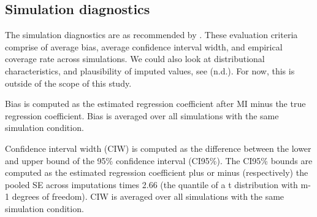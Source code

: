 \documentclass[article]{jss}
\begin{document}
\subsection{Simulation diagnostics}
The simulation diagnostics are as recommended by \cite[\S~2.5.2]{buur18}. These evaluation criteria comprise of average bias, average confidence interval width, and empirical coverage rate across simulations. %
We could also look at distributional characteristics, and plausibility of imputed values, see \cite{vinknd} (n.d.). For now, this is outside of the scope of this study. %



Bias is computed as the estimated regression coefficient after MI minus the true regression coefficient. Bias is averaged over all simulations with the same simulation condition.

Confidence interval width (CIW) is computed as the difference between the lower and upper bound of the 95\% confidence interval (CI95\%). The CI95\% bounds are computed as the estimated regression coefficient plus or minus (respectively) the pooled SE across imputations times 2.66 (the quantile of a t distribution with m-1 degrees of freedom). CIW is averaged over all simulations with the same simulation condition.
\end{document}
